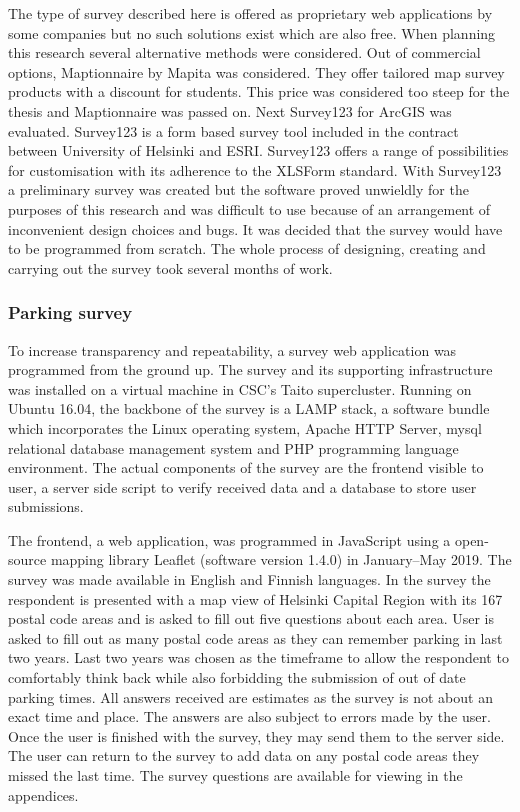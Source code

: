 The type of survey described here is offered as proprietary web applications by some companies but no such solutions exist which are also free. When planning this research several alternative methods were considered. Out of commercial options, Maptionnaire by Mapita was considered. They offer tailored map survey products with a discount for students. This price was considered too steep for the thesis and Maptionnaire was passed on. Next Survey123 for ArcGIS was evaluated. Survey123 is a form based survey tool included in the contract between University of Helsinki and ESRI. Survey123 offers a range of possibilities for customisation with its adherence to the XLSForm standard. With Survey123 a preliminary survey was created but the software proved unwieldly for the purposes of this research and was difficult to use because of an arrangement of inconvenient design choices and bugs. It was decided that the survey would have to be programmed from scratch. The whole process of designing, creating and carrying out the survey took several months of work.

\subsubsection{Parking survey}
\justify
To increase transparency and repeatability, a survey web application was programmed from the ground up. The survey and its supporting infrastructure was installed on a virtual machine in CSC's Taito supercluster. Running on Ubuntu 16.04, the backbone of the survey is a LAMP stack, a software bundle which incorporates the Linux operating system, Apache HTTP Server, \gls{mysql} relational database management system and PHP programming language environment. The actual components of the survey are the frontend visible to user, a server side script to verify received data and a database to store user submissions. 

The frontend, a web application, was programmed in JavaScript using a open-source mapping library Leaflet (software version 1.4.0) in January--May 2019. The survey was made available in English and Finnish languages. In the survey the respondent is presented with a map view of Helsinki Capital Region with its 167 postal code areas and is asked to fill out five questions about each area. User is asked to fill out as many postal code areas as they can remember parking in last two years. Last two years was chosen as the timeframe to allow the respondent to comfortably think back while also forbidding the submission of out of date parking times. All answers received are estimates as the survey is not about an exact time and place. The answers are also subject to errors made by the user. Once the user is finished with the survey, they may send them to the server side. The user can return to the survey to add data on any postal code areas they missed the last time. The survey questions are available for viewing in the appendices.

